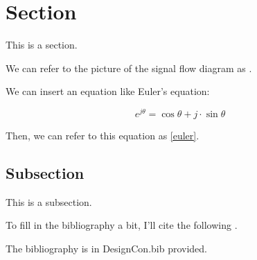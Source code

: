 \documentclass[12pt,twoside,english,american]{designcon}
\begin{document}
\section*{Section}

This is a section.

We can refer to the picture of the signal flow diagram as .

We can insert an equation like Euler's equation:

\begin{equation}
e^{j\theta}=\cos\theta+j\cdot\sin\theta\label{eq:euler}
\end{equation}

Then, we can refer to this equation as \eqref{euler}.

\subsection*{Subsection}

This is a subsection.

To fill in the bibliography a bit, I'll cite the following \cite{article,conference,phdthesis,unpublished}.

The bibliography is in DesignCon.bib provided.




\end{document}
